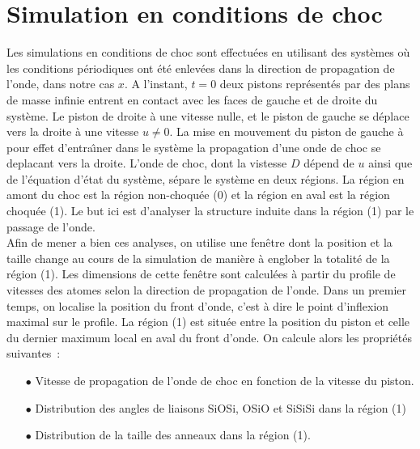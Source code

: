 \documentclass[aps,10pt,twocolumn]{revtex4}
\begin{document}
\section{Simulation en conditions de choc}

Les simulations en conditions de choc sont effectu\'ees en utilisant des syst\`emes o\`u les
conditions p\'eriodiques ont \'et\'e enlev\'ees dans la direction de propagation de l'onde, dans
notre cas $x$. A l'instant, $t=0$ deux pistons repr\'esent\'es par des plans de masse infinie
entrent en contact avec les faces de gauche et de droite du syst\`eme. Le piston de droite \`a une
vitesse nulle, et le piston de gauche se d\'eplace vers la droite \`a une vitesse $u\neq 0$.
La mise en mouvement du piston de gauche \`a pour effet d'entra\^{\i}ner dans le syst\`eme la
propagation d'une onde de choc se deplacant vers la droite. L'onde de choc, dont la vistesse $D$
d\'epend de $u$ ainsi  que de l'\'equation d'\'etat du syst\`eme, s\'epare le syst\`eme en deux
r\'egions. La r\'egion en amont du choc est la r\'egion non-choqu\'ee (0) et la r\'egion en aval
est la r\'egion choqu\'ee (1). Le but ici est d'analyser la structure induite dans la r\'egion
(1) par le passage de l'onde.\\

Afin de mener a bien ces analyses, on utilise une fen\^etre dont la position et la taille
change au cours de la simulation de mani\`ere \`a englober la totalit\'e de la r\'egion (1). Les
dimensions de cette fen\^etre sont calcul\'ees \`a partir du profile de vitesses des atomes
selon la direction de propagation de l'onde. Dans un premier temps, on localise la position du
front d'onde, c'est \`a dire le point d'inflexion maximal sur le profile. La r\'egion (1) est
situ\'ee entre la  position du piston et celle du dernier maximum local en aval du
front d'onde. On calcule alors les propri\'et\'es
suivantes~:
\begin{itemize}
	\item[$\bullet$] Vitesse de propagation de l'onde de choc en fonction de la vitesse du piston.
	\item[$\bullet$] Distribution des angles de liaisons SiOSi, OSiO et SiSiSi dans la r\'egion (1)
	\item[$\bullet$] Distribution de la taille des anneaux dans la r\'egion (1).\\
\end{itemize}
\end{document}

